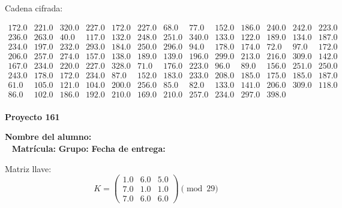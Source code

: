 \documentclass[12pt]{article}
\begin{document}
Cadena cifrada:
\begin{center}
$\begin{array}{lllllllllllll}
172.0 & 221.0 & 320.0 & 227.0 & 172.0 & 227.0 & 68.0 & 77.0 & 152.0 & 186.0 & 240.0 & 242.0 & 223.0\\
236.0 & 263.0 & 40.0 & 117.0 & 132.0 & 248.0 & 251.0 & 340.0 & 133.0 & 122.0 & 189.0 & 134.0 & 187.0\\
234.0 & 197.0 & 232.0 & 293.0 & 184.0 & 250.0 & 296.0 & 94.0 & 178.0 & 174.0 & 72.0 & 97.0 & 172.0\\
206.0 & 257.0 & 274.0 & 157.0 & 138.0 & 189.0 & 139.0 & 196.0 & 299.0 & 213.0 & 216.0 & 309.0 & 142.0\\
167.0 & 234.0 & 220.0 & 227.0 & 328.0 & 71.0 & 176.0 & 223.0 & 96.0 & 89.0 & 156.0 & 251.0 & 250.0\\
243.0 & 178.0 & 172.0 & 234.0 & 87.0 & 152.0 & 183.0 & 233.0 & 208.0 & 185.0 & 175.0 & 185.0 & 187.0\\
61.0 & 105.0 & 121.0 & 104.0 & 200.0 & 256.0 & 85.0 & 82.0 & 133.0 & 141.0 & 206.0 & 309.0 & 118.0\\
86.0 & 102.0 & 186.0 & 192.0 & 210.0 & 169.0 & 210.0 & 257.0 & 234.0 & 297.0 & 398.0\\
\end{array}$
\end{center}

\newpage


\textbf{Proyecto 161}

\textbf{Nombre del alumno:} \underline{\hspace{13cm}}\\\
\vspace{1cm}
\textbf{Matrícula:} \underline{\hspace{4cm}} \hspace{1cm}
\textbf{Grupo:} \underline{\hspace{2cm}}
\textbf{Fecha de entrega:} \underline{\hspace{2cm}}

\medskip

Matriz llave:
\[
K = \begin{pmatrix}
1.0 & 6.0 & 5.0\\
7.0 & 1.0 & 1.0\\
7.0 & 6.0 & 6.0
\end{pmatrix} \pmod{29}
\]
\end{document}
